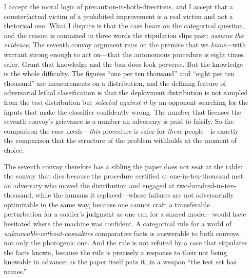 \documentclass[11pt]{article}
\begin{document}
I accept the moral logic of precaution-in-both-directions, and I accept that a counterfactual victim of a prohibited improvement is a real victim and not a rhetorical one. What I dispute is that the case bears on the categorical question, and the reason is contained in three words the stipulation slips past: \emph{assume the evidence}. The seventh convoy argument runs on the premise that we \emph{know}---with warrant strong enough to act on---that the autonomous procedure is eight times safer. Grant that knowledge and the ban does look perverse. But the knowledge is the whole difficulty. The figures ``one per ten thousand'' and ``eight per ten thousand'' are measurements on a distribution, and the defining feature of adversarial lethal classification is that the deployment distribution is not sampled from the test distribution but \emph{selected against it} by an opponent searching for the inputs that make the classifier confidently wrong. The number that licenses the seventh convoy's grievance is a number an adversary is paid to falsify. So the comparison the case needs---\emph{this} procedure is safer for \emph{these} people---is exactly the comparison that the structure of the problem withholds at the moment of choice.

The seventh convoy therefore has a sibling the paper does not seat at the table: the convoy that dies because the procedure certified at one-in-ten-thousand met an adversary who moved the distribution and engaged at two-hundred-in-ten-thousand, while the humans it replaced---whose failures are not adversarially optimizable in the same way, because one cannot craft a transferable perturbation for a soldier's judgment as one can for a shared model---would have hesitated where the machine was confident. A categorical rule for a world of \emph{unknowable-without-casualties} comparative facts is answerable to both convoys, not only the photogenic one. And the rule is not refuted by a case that stipulates the facts known, because the rule is precisely a response to their not being knowable in advance: as the paper itself puts it, in a weapon ``the test set has names.''
\end{document}
